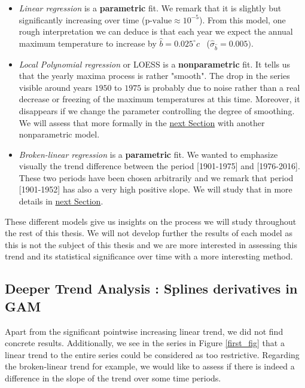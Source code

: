 \begin{itemize}
\item \emph{Linear regression} is a \textbf{parametric} fit. We remark that it is slightly but significantly increasing over time ($\text{p-value}\approx 10^{-5}$). From this model, one rough interpretation we can deduce is that each year we expect the annual maximum temperature to increase by $\hat{b}=0.025^{\circ}c$ \  ($\hat{\sigma}_{\hat{b}}=0.005)$.

\item \emph{Local Polynomial regression } or LOESS is a \textbf{nonparametric} fit. It tells us that the yearly maxima process is rather "smooth". The drop in the series visible around years $1950$ to $1975$ is probably due to noise rather than a real decrease or freezing of the maximum temperatures at this time. Moreover, it disappears if we change the parameter controlling the degree of smoothing. We will assess that more formally in the \hyperref[sec:splines]{next Section} with another nonparametric model.

\item \emph{Broken-linear regression} is a \textbf{parametric} fit. We wanted to emphasize visually the trend difference between the period [1901-1975] and [1976-2016]. These two periods have been chosen arbitrarily and we remark that period [1901-1952] has also a very high positive slope. We will study that in more details in \hyperref[sec:splines]{next Section}.
\end{itemize}
These different models give us insights on the process we will study throughout the rest of this thesis. We will not develop further the results of each model as this is not the subject of this thesis and we are more interested in assessing this trend and its statistical significance over time with a more interesting method.


\subsection{Deeper Trend Analysis : Splines derivatives in GAM}\label{sec:splines}

Apart from the significant pointwise increasing linear trend, we did not find concrete results. Additionally, we see in the series in Figure \ref{first_fig} that a linear trend to the entire series could be considered as too restrictive. Regarding the broken-linear trend for example, we would like to assess if there is indeed a difference in the slope of the trend over some time periods. 

